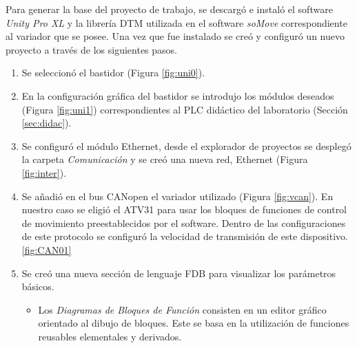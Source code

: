 Para generar la base del proyecto de trabajo, se descargó e instaló el software \textit{Unity Pro XL} y la librería DTM utilizada en el software \textit{soMove} correspondiente al variador que se posee. Una vez que fue instalado se creó y configuró un nuevo proyecto a través de los siguientes pasos.
\begin{enumerate}
	\item Se seleccionó el bastidor (Figura \ref{fig:uni0}).
	\item En la configuración gráfica del bastidor 
se introdujo los módulos
	deseados (Figura \ref{fig:uni1}) correspondientes al PLC didáctico del laboratorio (Sección \ref{sec:didac}). 
	\item Se configuró el módulo Ethernet, desde el explorador de
	proyectos se desplegó la
	carpeta \textit{Comunicación} y se creó una nueva red, Ethernet (Figura \ref{fig:inter}).
	\item Se añadió en el bus CANopen el variador utilizado (Figura \ref{fig:vcan}). En nuestro caso se eligió el ATV31 para usar los bloques de funciones de control de movimiento preestablecidos por el software. Dentro de las configuraciones de este protocolo se configuró la velocidad de transmisión de este dispositivo. \ref{fig:CAN01}
	\item Se creó una nueva sección de lenguaje FDB para visualizar los parámetros básicos.
	\begin{itemize}
		\item Los \textit{Diagramas de Bloques de Función} consisten en un editor gráfico orientado al dibujo
		de bloques. Este se basa en la utilización de funciones reusables elementales y
		derivados.
	\end{itemize}
\end{enumerate}
	

